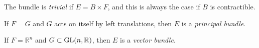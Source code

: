 \documentclass[a4paper,11pt]{article}
\begin{document}
    The bundle is \emph{trivial} if $E = B \times F$, and this is always the case if $B$ is contractible.

    If $F=G$ and $G$ acts on itself by left translations, then $E$ is a \emph{principal bundle}. 

    If $F=\mathbb{R}^n$ and $G \subset \operatorname{GL}(n,\mathbb{R})$, then $E$ is a \emph{vector bundle}.






    


    

\end{document}
